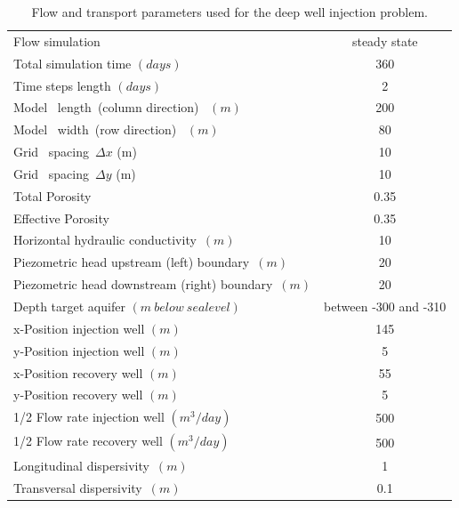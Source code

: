 \begin{table}
\caption{Flow and transport parameters used for the deep well injection problem.}
\begin{center}
\begin{tabular}{lc} \hline
Flow simulation                     & steady state \\
Total simulation time $(days)$       & 360  \\
Time steps length $(days)$       & 2 \\
Model \  length\ (column direction) \ $ (m)      $         &  200            \\
Model \  width\  (row direction) \ $ (m)      $         &   80            \\
Grid \ spacing\ $\Delta x $ (m)                &   10            \\
Grid \ spacing\ $\Delta y $ (m)                &   10            \\
Total Porosity\     $            $         &  0.35           \\
Effective Porosity\     $            $         &  0.35           \\
Horizontal hydraulic conductivity\ $(m)           $         &  10         \\  
Piezometric head upstream (left) boundary\ $(m)          $         &  20           \\ 
Piezometric head downstream (right) boundary\ $(m)        $         &  20           \\ 
Depth target aquifer $(m \ below \ sealevel)   $         &  between -300 and -310          \\ 
x-Position injection well $(m)   $         & 145          \\
y-Position injection well $(m)   $         &   5         \\
x-Position recovery well $(m)    $         &  55          \\
y-Position recovery well $(m)    $         &   5         \\
1/2 Flow rate injection well $(m^3/day)   $         &  500         \\
1/2 Flow rate recovery well $(m^3/day)    $         &  500         \\
Longitudinal dispersivity\ $(m)         $         &  1          \\ 
Transversal  dispersivity\ $(m)         $         &  0.1          \\ \hline

\end{tabular}
\label{ex_model_grid}
\end{center}
\end{table}

